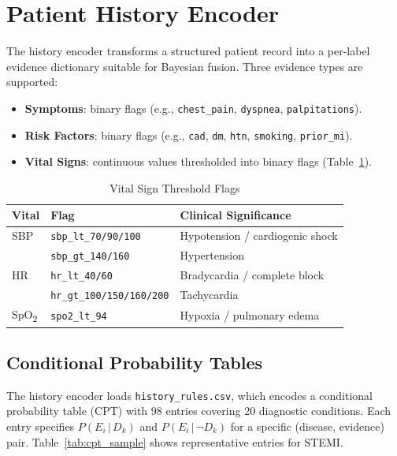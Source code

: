 \documentclass[journal]{IEEEtran}
\begin{document}
\section{Patient History Encoder}
\label{sec:history}

The history encoder transforms a structured patient record into
a per-label evidence dictionary suitable for Bayesian fusion.
Three evidence types are supported:
\begin{itemize}
  \item \textbf{Symptoms}: binary flags (e.g., \texttt{chest\_pain},
        \texttt{dyspnea}, \texttt{palpitations}).
  \item \textbf{Risk Factors}: binary flags (e.g., \texttt{cad},
        \texttt{dm}, \texttt{htn}, \texttt{smoking},
        \texttt{prior\_mi}).
  \item \textbf{Vital Signs}: continuous values thresholded into
        binary flags (Table~\ref{tab:vitals}).
\end{itemize}

\begin{table}[!t]
\centering
\caption{Vital Sign Threshold Flags}
\label{tab:vitals}
\begin{tabular}{@{}lll@{}}
  \toprule
  Vital & Flag & Clinical Significance \\
  \midrule
  SBP & \texttt{sbp\_lt\_70/90/100}  & Hypotension / cardiogenic shock \\
      & \texttt{sbp\_gt\_140/160}    & Hypertension \\
  HR  & \texttt{hr\_lt\_40/60}       & Bradycardia / complete block \\
      & \texttt{hr\_gt\_100/150/160/200} & Tachycardia \\
  SpO\textsubscript{2}
      & \texttt{spo2\_lt\_94}        & Hypoxia / pulmonary edema \\
  \bottomrule
\end{tabular}
\end{table}

\subsection{Conditional Probability Tables}

The history encoder loads \texttt{history\_rules.csv}, which
encodes a conditional probability table (CPT) with 98 entries
covering 20 diagnostic conditions.
Each entry specifies $P(E_i \,|\, D_k)$ and
$P(E_i \,|\, \neg D_k)$ for a specific
(disease, evidence) pair.
Table~\ref{tab:cpt_sample} shows representative entries for STEMI.
\end{document}
